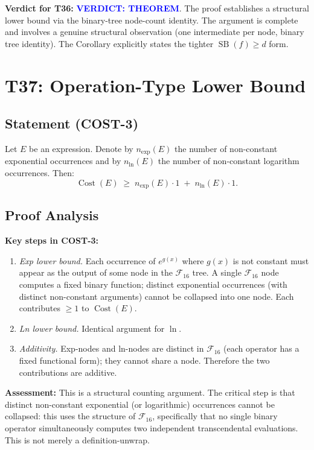 \documentclass[12pt,a4paper]{article}
\theoremstyle{definition}
\newcommand{\Cost}{\operatorname{Cost}}
\newcommand{\SB}{\operatorname{SB}}
\newcommand{\Fam}{\mathcal{F}}
\newcommand{\verdictTHEOREM}{\textbf{\textcolor{blue}{VERDICT: THEOREM}}}
\begin{document}
\textbf{Verdict for T36:}  \verdictTHEOREM.
The proof establishes a structural lower bound via the binary-tree node-count
identity.  The argument is complete and involves a genuine structural
observation (one intermediate per node, binary tree identity).  The Corollary
explicitly states the tighter $\SB(f) \geq d$ form.

\section{T37: Operation-Type Lower Bound}

\subsection{Statement (COST-3)}

Let $E$ be an expression.  Denote by $n_{\exp}(E)$ the number of
non-constant exponential occurrences and by $n_{\ln}(E)$ the number of
non-constant logarithm occurrences.  Then:
\[
  \Cost(E) \;\geq\; n_{\exp}(E) \cdot 1 \;+\; n_{\ln}(E) \cdot 1.
\]

\subsection{Proof Analysis}

\textbf{Key steps in COST-3:}
\begin{enumerate}
  \item \emph{Exp lower bound.}  Each occurrence of $e^{g(x)}$ where $g(x)$
        is not constant must appear as the output of some node in the
        $\Fam_{16}$ tree.  A single $\Fam_{16}$ node computes a fixed binary
        function; distinct exponential occurrences (with distinct non-constant
        arguments) cannot be collapsed into one node.  Each contributes $\geq 1$
        to $\Cost(E)$.
  \item \emph{Ln lower bound.}  Identical argument for $\ln$.
  \item \emph{Additivity.}  Exp-nodes and ln-nodes are distinct in $\Fam_{16}$
        (each operator has a fixed functional form); they cannot share a node.
        Therefore the two contributions are additive.
\end{enumerate}

\textbf{Assessment:}  This is a structural counting argument.  The critical
step is that distinct non-constant exponential (or logarithmic) occurrences
cannot be collapsed: this uses the structure of $\Fam_{16}$, specifically that
no single binary operator simultaneously computes two independent transcendental
evaluations.  This is not merely a definition-unwrap.
\end{document}
